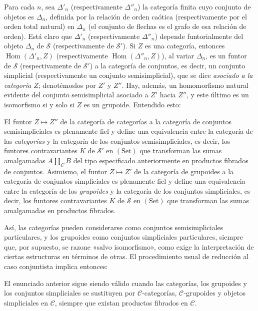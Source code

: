 Para cada $n$, sea $\Delta'_n$ (respectivamente $\Delta''_n$) la categoría
finita cuyo conjunto de objetos es $\Delta_n$, definida por la relación de
orden caótica (respectivamente por el orden total natural) en $\Delta_n$ (el
conjunto de flechas es el grafo de esa relación de orden). Está claro que
$\Delta'_n$ (respectivamente $\Delta''_n$) depende funtorialmente del objeto
$\Delta_n$ de $\mathcal S$ (respectivamente de $\mathcal S'$). Si $Z$ es una
categoría, entonces $\operatorname{Hom}(\Delta'_n,Z)$ (respectivamente
$\operatorname{Hom}(\Delta''_n,Z)$), al variar $\Delta_n$, es un funtor de
$\mathcal S$ (respectivamente de $\mathcal S'$) a la categoría de conjuntos,
es decir, un conjunto simplicial (respectivamente un conjunto
semisimplicial), que se dice \emph{asociado a la categoría $Z$}; denotémoslos
por $Z'$ y $Z''$. Hay, además, un homomorfismo natural evidente del conjunto
semisimplicial asociado a $Z'$ hacia $Z''$, y este último es un isomorfismo si
y solo si $Z$ es un grupoide. Entendido esto:

 El funtor $Z\longmapsto Z''$ de la categoría de
categorías a la categoría de conjuntos semisimpliciales es plenamente fiel y
define una equivalencia entre la categoría de las \emph{categorías} y la
categoría de los conjuntos semisimpliciales, es decir, los funtores
contravariantes $K$ de $\mathcal S'$ en $(\mathrm{Set})$ que transforman las
sumas amalgamadas $A\amalg_C B$ del tipo especificado anteriormente en productos
fibrados de conjuntos. Asimismo, el funtor $Z\longmapsto Z'$ de la categoría
de grupoides a la categoría de conjuntos simpliciales es plenamente fiel y
define una equivalencia entre la categoría de los \emph{grupoides} y la
categoría de los
conjuntos simpliciales, es decir, los funtores contravariantes $K$ de
$\mathcal S$ en $(\mathrm{Set})$ que transforman las sumas amalgamadas en productos
fibrados.

Así, las categorías pueden considerarse como conjuntos semisimpliciales
particulares, y los grupoides como conjuntos simpliciales particulares,
siempre que, por supuesto, se razone «salvo isomorfismo», como exige la
interpretación de ciertas estructuras en términos de otras. El procedimiento
usual de reducción al caso conjuntista implica entonces:

 El enunciado anterior sigue siendo válido cuando las
categorías, los grupoides y los conjuntos simpliciales se sustituyen por
$\mathcal C$-categorías, $\mathcal C$-grupoides y objetos simpliciales en
$\mathcal C$, siempre que existan productos fibrados en $\mathcal C$.

